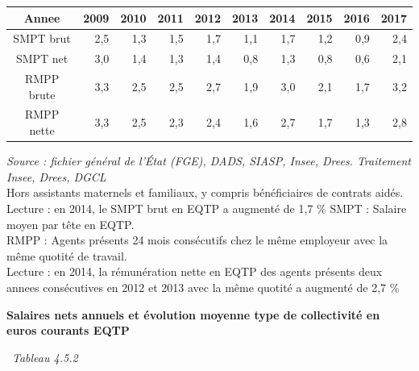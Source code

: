 \begin{longtable}[]{@{}crrrrrrrrr@{}}
\toprule
Annee & 2009 & 2010 & 2011 & 2012 & 2013 & 2014 & 2015 & 2016 &
2017\tabularnewline
\midrule
\endhead
SMPT brut & 2,5 & 1,3 & 1,5 & 1,7 & 1,1 & 1,7 & 1,2 & 0,9 &
2,4\tabularnewline
SMPT net & 3,0 & 1,4 & 1,3 & 1,4 & 0,8 & 1,3 & 0,8 & 0,6 &
2,1\tabularnewline
RMPP brute & 3,3 & 2,5 & 2,5 & 2,7 & 1,9 & 3,0 & 2,1 & 1,7 &
3,2\tabularnewline
RMPP nette & 3,3 & 2,5 & 2,3 & 2,4 & 1,6 & 2,7 & 1,7 & 1,3 &
2,8\tabularnewline
\bottomrule
\end{longtable}

\emph{Source : fichier général de l'État (FGE), DADS, SIASP, Insee,
Drees. Traitement Insee, Drees, DGCL}\\
Hors assistants maternels et familiaux, y compris bénéficiaires de
contrats aidés.\\
Lecture : en 2014, le SMPT brut en EQTP a augmenté de 1,7 \% SMPT :
Salaire moyen par tête en EQTP.\\
RMPP : Agents présents 24 mois consécutifs chez le même employeur avec
la même quotité de travail.\\
Lecture : en 2014, la rémunération nette en EQTP des agents présents
deux annees consécutives en 2012 et 2013 avec la même quotité a augmenté
de 2,7 \%

\textbf{Salaires nets annuels et évolution moyenne type de collectivité
en euros courants EQTP}

~\emph{Tableau 4.5.2}

